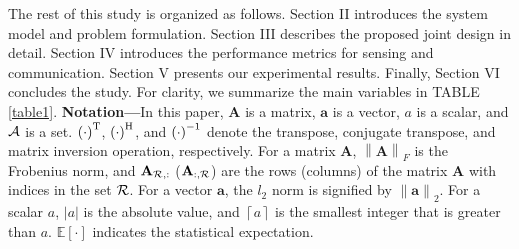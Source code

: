 \documentclass[journal,12pt,onecolumn,draftclsnofoot,]{IEEEtran}
\begin{document}
The rest of this study is organized as follows. Section II introduces the system model and problem formulation. 
Section III describes the proposed joint design in detail. 
Section IV introduces the performance metrics for sensing and communication. 
Section V presents our experimental results. 
Finally, Section VI concludes the study. 
{\color{black} For clarity, we summarize the main variables in TABLE \ref{table1}.}
{\color{black}
\textbf{Notation---}In this paper, 
${\mathbf A}$ is a matrix, ${\mathbf a}$ is a vector, $a$ is a scalar, and ${\cal A}$ is a set.
$\left( \cdot \right)^{\rm T}$, $\left( \cdot \right)^{\rm H}$, and $\left( \cdot \right)^{\rm -1}$ denote the transpose, conjugate transpose, and matrix inversion operation, respectively. 
For a matrix ${\mathbf A}$, $\left\|{{\mathbf A}}\right\|_F$ is the Frobenius norm, and ${\mathbf A}_{{\cal R},:}$ (${\mathbf A}_{:,{\cal R}}$) are the rows (columns) of the matrix ${\mathbf A}$ with indices in the set ${\cal R}$. %
For a vector ${\mathbf a}$, the ${l_2}$ norm is signified by $\left\|{{\mathbf a}}\right\|_2$. 
For a scalar ${ a}$, $\left|{a}\right|$ is the absolute value, and $\left\lceil{a}\right\rceil$ is the smallest integer that is greater than ${ a}$. 
$\mathbb{E}\left[{\cdot}\right]$ indicates the statistical expectation. 
}
\end{document}
